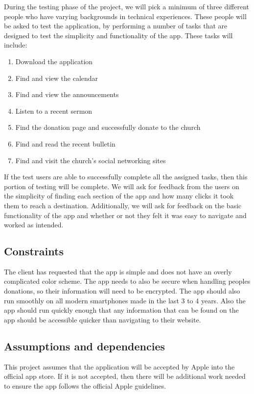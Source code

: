 \documentclass[letterpaper,10pt,draftclsnofoot,onecolumn,titlepage]{IEEEtran}
\begin{document}
	During the testing phase of the project, we will pick a minimum of three different people who have varying backgrounds in technical experiences. 
	These people will be asked to test the application, by performing a number of tasks that are designed to test the simplicity and functionality of the app. 
	These tasks will include: 
	\begin{enumerate}
		\item{Download the application}
		\item{Find and view the calendar}
		\item{Find and view the announcements}
		\item{Listen to a recent sermon}
		\item{Find the donation page and successfully donate to the church}
		\item{Find and read the recent bulletin}
		\item{Find and visit the church's social networking sites}
	\end{enumerate}
	If the test users are able to successfully complete all the assigned tasks, then this portion of testing will be complete. 
	We will ask for feedback from the users on the simplicity of finding each section of the app and how many clicks it took them to reach a destination.
	Additionally, we will ask for feedback on the basic functionality of the app and whether or not they felt it was easy to navigate and worked as intended.

	\subsection{Constraints}
	The client has requested that the app is simple and does not have an overly complicated color scheme.
	The app needs to also be secure when handling peoples donations, so their information will need to be encrypted.
	The app should also run smoothly on all modern smartphones made in the last 3 to 4 years.
	Also the app should run quickly enough that any information that can be found on the app should be accessible quicker than navigating to their website.

	\subsection{Assumptions and dependencies}
	This project assumes that the application will be accepted by Apple into the official app store.
	If it is not accepted, then there will be additional work needed to ensure the app follows the official Apple guidelines.
\end{document}
